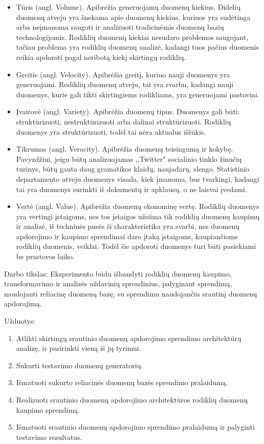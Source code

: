 \documentclass{VUMIFPSkursinis}
\begin{document}
\begin{itemize}
    \item Tūris (angl. Volume). Apibrėžia generuojamų duomenų kiekius. Didelių duomenų atveju yra šnekama apie duomenų kiekius, kuriuos yra sudėtinga arba neįmanoma saugoti 
    ir analizuoti tradicinėmis duomenų bazių technologijomis. Rodiklių duomenų kiekiai nesudaro problemos saugojant, tačiau problema yra rodiklių duomenų analizė, 
    kadangi tuos pačius duomenis reikia apdoroti pagal neribotą kiekį skirtingų rodiklių.
    \item Greitis (angl. Velocity). Apibrėžia greitį, kuriuo nauji duomenys yra generuojami. Rodiklių duomenų atveju, tai yra svarbu, kadangi nauji duomenys, kurie gali 
    tikti skirtingiems rodikliams, yra generuojami pastoviai.
    \item Įvairovė (angl. Variety). Apibrėžia duomenų tipus. Duomenys gali būti: struktūrizuoti, nestruktūrizuoti arba dalinai struktūrizuoti\cite{zikopoulos2011understanding}. 
    Rodiklių duomenys yra struktūrizuoti, todėl tai nėra aktualus iššūkis.
    \item Tikrumas (angl. Veracity). Apibrėžia duomenų teisingumą ir kokybę. Pavyzdžiui, jeigu būtų analizuojamas ,,Twitter" socialinio tinklo žinučių turinys, būtų gauta
    daug gramatikos klaidų, naujadarų, slengo. 
    Statistinio departamento atveju duomenys visada, kiek įmanoma, bus tvarkingi, kadangi tai yra duomenys surinkti iš dokumentų ir apklausų, o ne laisvai įvedami.
    \item Vertė (angl. Value). Apibrėžia duomenų ekonominę vertę. Rodiklių duomenys yra vertingi įstaigoms, nes tos įstaigos užsiima tik rodiklių duomenų kaupimų ir analizė, iš techninės pusės
    ši charakteristika yra svarbi, nes duomenų apdorojimo ir kaupimo sprendimai daro įtaką įstaigoms, kaupiančioms rodiklių duomenis, veiklai. 
    Todėl šie apdoroti duomenys turi būti pasiekiami be prastovos laiko.
\end{itemize}\par

Darbo tikslas: Eksperimento būdu išbandyti rodiklių duomenų kaupimo, transformavimo ir analizės uždavinių sprendinius, 
palyginant sprendimą, naudojanti reliacinę duomenų bazę, su sprendimu naudojančiu srautinį duomenų apdorojimą. \par
\newpage
Užduotys:
\begin{enumerate}
    \item Atlikti skirtingų srautinio duomenų apdorojimo sprendimo architektūrų analizę, ir pasirinkti vieną iš jų tyrimui.
    \item Sukurti testavimo duomenų generatorių.
    \item Išmatuoti sukurto reliacinės duomenų bazės sprendimo pralaidumą.
    \item Realizuoti srautinio duomenų apdorojimo architektūros rodiklių duomenų kaupimo sprendimą.
    \item Išmatuoti srautinio duomenų apdorojimo sprendimo pralaidumą ir palyginti testavimo rezultatus.
\end{enumerate}
\end{document}
